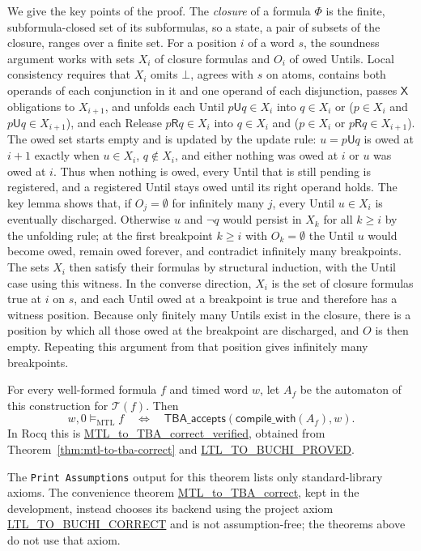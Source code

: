 \documentclass[manuscript]{acmart}
\newcommand{\satM}{\models_{\mathrm{MTL}}}
\newcommand{\Until}{\mathbin{\mathsf{U}}}
\newcommand{\Release}{\mathbin{\mathsf{R}}}
\newcommand{\Next}{\mathsf{X}}
\newcommand{\T}{\mathcal{T}}
\newcommand{\Rocqid}[1]{\url{#1}}
\begin{document}
We give the key points of the proof. The \emph{closure} of a formula $\Phi$ is
the finite, subformula-closed set of its subformulas, so a state, a pair of
subsets of the closure, ranges over a finite set. For a position $i$ of a word
$s$, the soundness argument works with sets $X_i$ of closure formulas and
$O_i$ of owed Untils. Local consistency requires that $X_i$ omits $\bot$,
agrees with $s$ on atoms, contains both operands of each conjunction in it and
one operand of each disjunction, passes $\Next$ obligations to $X_{i+1}$, and
unfolds each Until $p\Until q\in X_i$ into $q\in X_i$ or
($p\in X_i$ and $p\Until q\in X_{i+1}$), and each Release
$p\Release q\in X_i$ into $q\in X_i$ and ($p\in X_i$ or
$p\Release q\in X_{i+1}$). The owed set starts empty and is updated by the
update rule: $u=p\Until q$ is owed at $i+1$ exactly when $u\in X_i$, $q\notin X_i$,
and either nothing was owed at $i$ or $u$ was owed at $i$. Thus when nothing is
owed, every Until that is still pending is registered, and a registered Until
stays owed until its right operand holds. The key lemma shows that, if $O_j=\emptyset$
for infinitely many $j$, every Until $u\in X_i$ is eventually discharged.
Otherwise $u$ and $\neg q$ would persist in $X_k$ for all $k\ge i$ by the unfolding
rule; at the first breakpoint $k\ge i$ with $O_k=\emptyset$ the Until $u$ would become owed, remain owed forever,
and contradict infinitely many breakpoints. The sets $X_i$ then satisfy their
formulas by structural induction, with the Until case using this witness. In the converse direction, $X_i$ is the set of
closure formulas true at $i$ on $s$, and each Until owed at a breakpoint is true and therefore has a witness
position. Because only finitely many Untils exist in the closure, there is a
position by which all those owed at the breakpoint are discharged, and $O$ is then
empty. Repeating this argument from that position gives infinitely many
breakpoints.
\begin{theorem}
\label{thm:verified}
For every well-formed formula $f$ and timed word $w$, let $A_f$ be the
automaton of this construction for $\T(f)$. Then
\[
w,0\satM f
\quad\Longleftrightarrow\quad
\mathsf{TBA\_accepts}(\mathsf{compile\_with}(A_f),w).
\]
In Rocq this is \Rocqid{MTL_to_TBA_correct_verified}, obtained from
Theorem~\ref{thm:mtl-to-tba-correct} and \Rocqid{LTL_TO_BUCHI_PROVED}.
\end{theorem}
The \texttt{Print Assumptions} output for this theorem lists only standard-library axioms. The
convenience theorem \Rocqid{MTL_to_TBA_correct}, kept in the development,
instead chooses its backend using the project axiom
\Rocqid{LTL_TO_BUCHI_CORRECT} and is not assumption-free; the theorems above
do not use that axiom.
\end{document}
